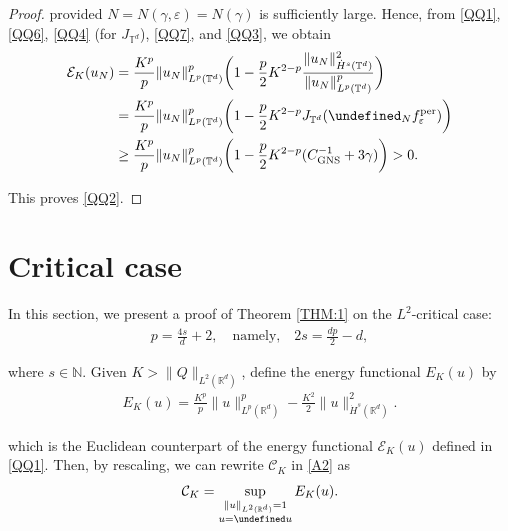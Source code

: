 \documentclass[letterpaper, 11pt,  reqno]{amsart}
\newcommand{\noi}{\noindent}
\newcommand{\R}{\mathbb{R}}
\newcommand{\T}{\mathbb{T}}
\let\P= \undefined
\newcommand{\P}{\mathbf{P}}
\newcommand{\eps}{\varepsilon}
\newcommand{\g}{\gamma}
\newcommand{\N}{\mathbb{N}}
\newcommand{\EE}{\mathcal{E}}
\numberwithin{equation}{section}
\numberwithin{theorem}{section}
\newcommand{\CC}{\mathcal{C}}
\newcommand{\GNS}{\textup{GNS}}
\newcommand{\per}{\textup{per}}
\begin{document}
\begin{proof}
\noi
provided $N = N(\g, \eps) = N(\g)$
is sufficiently large.
Hence, 
from 
\eqref{QQ1}, \eqref{QQ6}, \eqref{QQ4} (for $J_{\T^d}$), \eqref{QQ7}, 
and \eqref{QQ3}, we obtain
\begin{align*}   
\EE_K(u_N) 
&= \frac{K^{p}}{p}\|u_N\|^{p}_{L^{p}(\T^d)}\bigg(1-\frac{p}{2}K^{2-p}\frac{\|u_N\|^2_{\dot H^{s}(\T^d)}}{\|u_N\|^p_{L^{p}(\T^d)}}\bigg)\notag\\
&=\frac{K^{p}}{p}\|u_N\|^{p}_{L^{p}(\T^d)}
\bigg(1-\frac{p}{2}K^{2-p}J_{\T^d}(\P_{N}f_{\eps}^\per)\bigg)\notag\\
& \ge \frac{K^{p}}{p}\|u_N\|^{p}_{L^{p}(\T^d)}
 \bigg(1-\frac{p}{2}K^{2-p}( C^{-1}_{\GNS}+3\gamma)\bigg) > 0.
\end{align*}

\noi 
This proves \eqref{QQ2}.
\end{proof}







\section{Critical case} %
\label{SEC:3}



In this section, we present a proof of Theorem \ref{THM:1}
on the $L^2$-critical case:
\begin{align}
 p=\frac{4s}{d}+2, \quad \text{namely,}\quad
2s =  \frac {dp}2 - d, 
 \label{up0a}
\end{align}

\noi
where $s \in \N$.
Given  $K> \|Q\|_{L^2 (\R^d)}$, define the energy functional $E_K(u)$ by 
\begin{align}
E_K(u)
= \frac{K^p}{p}\|u\|^{p}_{L^p(\R^d)}-\frac{K^2}{2}\|u\|^2_{\dot H^{s}(\R^d)}.
\label{EE1}
\end{align}


\noi
which is the Euclidean counterpart of the energy functional $\EE_K(u)$
defined in \eqref{QQ1}.
Then, 
by rescaling, 
we can rewrite 
$\CC_K$  in \eqref{A2}
as 
\begin{align}
\CC_K=\sup_{\substack{\|u\|_{L^2(\R^d)} = 1\\ 
u = \P u}} E_K(u).
\label{up0b}
\end{align}
\end{document}
